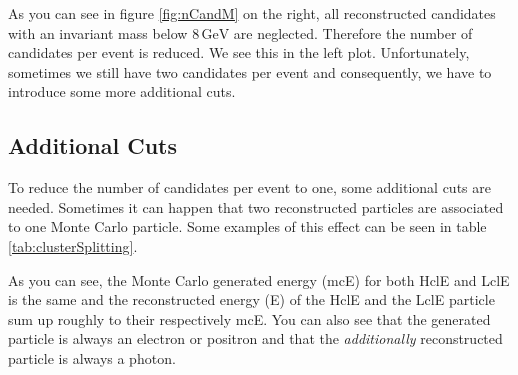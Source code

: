 \documentclass[a4paper,11pt,twosided,final,german,openbib,pdftex,listof=totoc,bibliography=totoc]{scrbook}
\begin{document}
As you can see in figure \ref{fig:nCandM} on the right, all reconstructed candidates with an invariant mass below $8\,\textrm{GeV}$ are neglected. Therefore the number of candidates per event is reduced. We see this in the left plot. Unfortunately, sometimes we still have two candidates per event and consequently, we have to introduce some more additional cuts.



\subsection{Additional Cuts}

To reduce the number of candidates per event to one, some additional cuts are needed. Sometimes it can happen that two reconstructed particles are associated to one Monte Carlo particle. Some examples of this effect can be seen in table \ref{tab:clusterSplitting}. 


\begin{table}[h!]
	\centering
	\caption[Cluster Splitting Examples]{Some examples for events with cluster splitting. mcE is the same for LclE and HclE. The energies are in GeV. }
	\label{tab:clusterSplitting}
\end{table}




As you can see, the Monte Carlo generated energy (mcE) for both HclE and LclE is the same and the reconstructed energy (E) of the HclE and the LclE particle sum up roughly to their respectively mcE. You can also see that the generated particle is always an electron or positron and that the \textit{additionally} reconstructed particle is always a photon.
\end{document}
